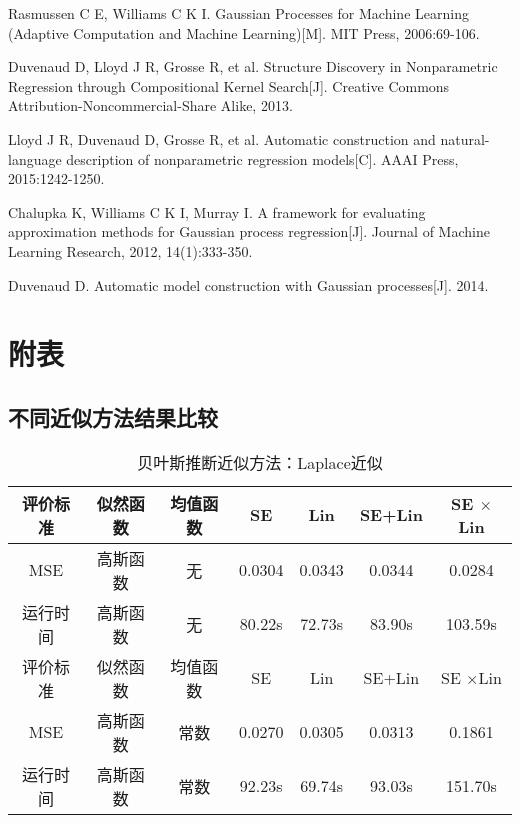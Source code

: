 \documentclass[10pt,twocolumn]{article}
\begin{document}
\begin{thebibliography}{1}
Rasmussen C E, Williams C K I. Gaussian Processes for Machine Learning (Adaptive Computation and Machine Learning)[M]. MIT Press, 2006:69-106.

Duvenaud D, Lloyd J R, Grosse R, et al. Structure Discovery in Nonparametric Regression through Compositional Kernel Search[J]. Creative Commons Attribution-Noncommercial-Share Alike, 2013.

Lloyd J R, Duvenaud D, Grosse R, et al. Automatic construction and natural-language description of nonparametric regression models[C]. AAAI Press, 2015:1242-1250.

Chalupka K, Williams C K I, Murray I. A framework for evaluating approximation methods for Gaussian process regression[J]. Journal of Machine Learning Research, 2012, 14(1):333-350.

Duvenaud D. Automatic model construction with Gaussian processes[J]. 2014.

\end{thebibliography}

\onecolumn
\section{附表}
\subsection{不同近似方法结果比较}
\begin{table}[!htbp]
\centering
\begin{tabular}{c|c|c|c|c|c|c}
\hline\hline
评价标准&似然函数&均值函数&SE&Lin&SE+Lin&SE $\times$Lin\\ \hline
MSE&高斯函数&无& 0.0304 & 0.0343 & 0.0344 & 0.0284 \\
运行时间&高斯函数&无& 80.22s & 72.73s & 83.90s & 103.59s\\\hline
评价标准&似然函数&均值函数&SE&Lin&SE+Lin&SE $\times$Lin\\ \hline
MSE&高斯函数&常数&0.0270 & 0.0305 & 0.0313 & 0.1861 \\
运行时间&高斯函数&常数& 92.23s & 69.74s & 93.03s &  151.70s\\
\hline\hline
\end{tabular}
\caption{贝叶斯推断近似方法：Laplace近似}
\label{laplace}
\end{table}
\end{document}
